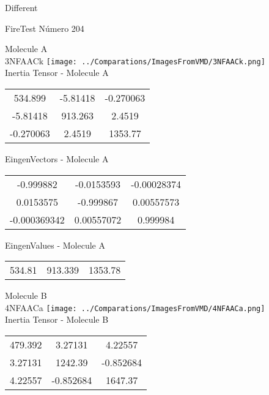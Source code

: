 \begin{center}
\vtab
\vtab
\textcolor{NavyBlue}{\Large Different}
\end{center}

 \newpage

\vtab[-2cm]
\begin{center}
{\large FireTest \tab Número 204}
\end{center}
\begin{multicols}{2}
\begin{center}

Molecule A \\ 
3NFAACk
\texttt{[image: ../Comparations/ImagesFromVMD/3NFAACk.png]}
\\
Inertia Tensor - Molecule A \\
\vtab

\begin{tabular}{|c c c|}
534.899	 & 	-5.81418	 & 	-0.270063	 \\
-5.81418	 & 	913.263	 & 	2.4519	 \\
-0.270063	 & 	2.4519	 & 	1353.77
\end{tabular}

\vtab
 EingenVectors - Molecule A     \\
\vtab
\begin{tabular}{|c c c|}
-0.999882	 & 	-0.0153593	 & 	-0.00028374	 \\
0.0153575	 & 	-0.999867	 & 	0.00557573	 \\
-0.000369342	 & 	0.00557072	 & 	0.999984
\end{tabular}

\vtab
 EingenValues - Molecule A     \\
\vtab
\begin{tabular}{|c c c|}
534.81	 & 	913.339	 & 	1353.78	 \\
\end{tabular}
\columnbreak

Molecule B \\ 
4NFAACa
\texttt{[image: ../Comparations/ImagesFromVMD/4NFAACa.png]}
\\
Inertia Tensor - Molecule B \\
\vtab

\begin{tabular}{|c c c|}
479.392	 & 	3.27131	 & 	4.22557	 \\
3.27131	 & 	1242.39	 & 	-0.852684	 \\
4.22557	 & 	-0.852684	 & 	1647.37
\end{tabular}


\end{center}
\end{multicols}
